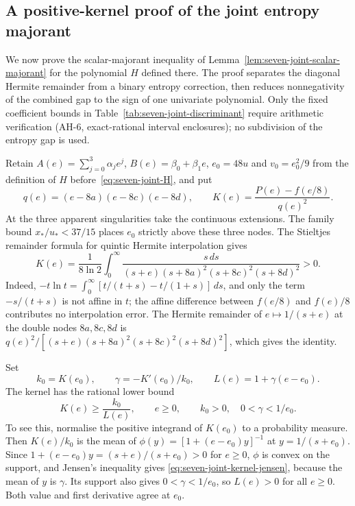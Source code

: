 \subsection{A positive-kernel proof of the joint entropy majorant}
\label{sec:seven-joint-analytic-proof}

We now prove the scalar-majorant inequality of Lemma~\ref{lem:seven-joint-scalar-majorant}
for the polynomial $H$ defined there. The proof separates the diagonal Hermite remainder from
a binary entropy correction, then reduces nonnegativity of the combined gap to the
sign of one univariate polynomial. Only the fixed coefficient bounds in
Table~\ref{tab:seven-joint-discriminant} require arithmetic verification
(AH-6, exact-rational interval enclosures); no subdivision of the entropy gap is used.

Retain $A(e)=\sum_{j=0}^3\alpha_je^j$, $B(e)=\beta_0+\beta_1e$,
$e_0=48u$ and $v_0=e_0^2/9$ from the definition of $H$ before~\eqref{eq:seven-joint-H}, and put
\[
 q(e)=(e-8a)(e-8c)(e-8d),\qquad
 K(e)=\frac{P(e)-f(e/8)}{q(e)^2}.
\]
At the three apparent singularities take the continuous extensions.
The family bound $x_*/u_*<37/15$ places $e_0$ strictly above these three nodes.
The Stieltjes remainder formula for quintic Hermite interpolation gives
\begin{equation}\label{eq:seven-joint-stieltjes}
 K(e)=\frac1{8\ln2}\int_0^\infty
 \frac{s\,ds}{(s+e)(s+8a)^2(s+8c)^2(s+8d)^2}>0.
\end{equation}
Indeed, $-t\ln t=\int_0^\infty[t/(t+s)-t/(1+s)]\,ds$, and only the term
$-s/(t+s)$ is not affine in $t$; the affine difference between $f(e/8)$ and
$f(e)/8$ contributes no interpolation error. The Hermite remainder of
$e\mapsto1/(s+e)$ at the double nodes $8a,8c,8d$ is
$q(e)^2/[(s+e)(s+8a)^2(s+8c)^2(s+8d)^2]$, which gives the identity.

Set
\[
 k_0=K(e_0),\qquad \gamma=-K'(e_0)/k_0,
 \qquad L(e)=1+\gamma(e-e_0).
\]
The kernel has the rational lower bound
\begin{equation}\label{eq:seven-joint-kernel-jensen}
 K(e)\ge\frac{k_0}{L(e)},\qquad e\ge0,
 \qquad k_0>0,\quad0<\gamma<1/e_0.
\end{equation}
To see this, normalise the positive integrand of $K(e_0)$ to a probability
measure. Then $K(e)/k_0$ is the mean of $\phi(y)=[1+(e-e_0)y]^{-1}$ at
$y=1/(s+e_0)$. Since $1+(e-e_0)y=(s+e)/(s+e_0)>0$ for $e\ge0$, $\phi$ is
convex on the support, and Jensen's inequality gives
\eqref{eq:seven-joint-kernel-jensen}, because the mean of $y$ is
$\gamma$. Its support also gives $0<\gamma<1/e_0$, so $L(e)>0$ for
all $e\ge0$. Both value and first derivative agree at $e_0$.

